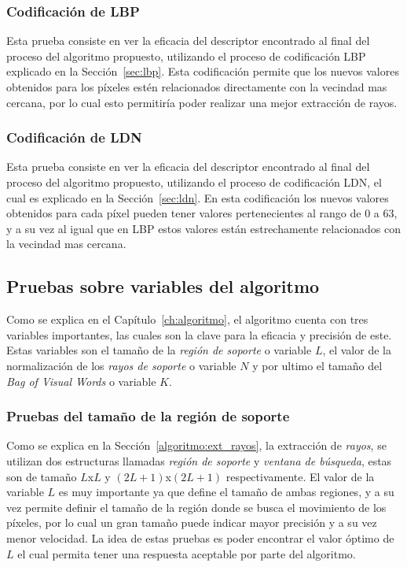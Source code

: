 	\subsubsection{Codificación de LBP}
	Esta prueba consiste en ver la eficacia del descriptor encontrado al final del proceso del algoritmo propuesto, utilizando el proceso de codificación LBP explicado en la Sección~\ref{sec:lbp}. Esta codificación permite que los nuevos valores obtenidos para los píxeles estén relacionados directamente con la vecindad mas cercana, por lo cual esto permitiría poder realizar una mejor extracción de rayos.
	
	\subsubsection{Codificación de LDN}
	Esta prueba consiste en ver la eficacia del descriptor encontrado al final del proceso del algoritmo propuesto, utilizando el proceso de codificación LDN, el cual es explicado en la Sección~\ref{sec:ldn}. En esta codificación los nuevos valores obtenidos para cada píxel pueden tener valores pertenecientes al rango de 0 a 63, y a su vez al igual que en LBP estos valores están estrechamente relacionados con la vecindad mas cercana.

\subsection{Pruebas sobre variables del algoritmo}
\label{exp:var}
Como se explica en el Capítulo~\ref{ch:algoritmo}, el algoritmo cuenta con tres variables importantes, las cuales son la clave para la eficacia y precisión de este. Estas variables son el tamaño de la \textit{región de soporte} o variable $L$, el valor de la normalización de los \textit{rayos de soporte} o variable $N$ y por ultimo el tamaño del \textit{Bag of Visual Words} o variable $K$.

	\subsubsection{Pruebas del tamaño de la región de soporte}
	Como se explica en la Sección~\ref{algoritmo:ext_rayos}, la extracción de \textit{rayos}, se utilizan dos estructuras llamadas \textit{región de soporte} y \textit{ventana de búsqueda}, estas son de tamaño $L$x$L$ y $(2L+1)$x$(2L+1)$ respectivamente. El valor de la variable $L$ es muy importante ya que define el tamaño de ambas regiones, y a su vez permite definir el tamaño de la región donde se busca el movimiento de los píxeles, por lo cual un gran tamaño puede indicar mayor precisión y a su vez menor velocidad. La idea de estas pruebas es poder encontrar el valor óptimo de $L$ el cual permita tener una respuesta aceptable por parte del algoritmo. 

